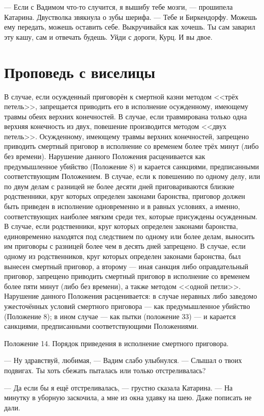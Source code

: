 --- Если с Вадимом что-то случится, я вышибу тебе мозги, --- прошипела Катарина.
Двустволка звякнула о зубы шерифа.
--- Тебе и Биркендорфу.
Можешь ему передать, можешь оставить себе.
Выкручивайся как хочешь.
Ты сам заварил эту кашу, сам и отвечать будешь.
Уйди с дороги, Курц.
И вы двое.

\section{Проповедь с виселицы}

\epigraph{
В случае, если осужденный приговорён к смертной казни методом <<трёх петель>>, запрещается приводить его в исполнение осужденному, имеющему травмы обеих верхних конечностей.
В случае, если травмирована только одна верхняя конечность из двух, повешение производится методом <<двух петель>>.
Осужденному, имеющему травмы верхних конечностей, запрещено приводить смертный приговор в исполнение со временем более трёх минут (либо без времени).
Нарушение данного Положения расценивается как предумышленное убийство (Положение 8) и карается санкциями, предписанными соответствующим Положением.
В случае, если к повешению по одному делу, или по двум делам с разницей не более десяти дней приговариваются близкие родственники, круг которых определен законами баронства, приговор должен быть приведен в исполнение одновременно и в равных условиях, а именно, соответствующих наиболее мягким среди тех, которые присуждены осужденным.
В случае, если родственники, круг которых определен законами баронства, единовременно находятся под следствием по одному или более делам, выносить им приговоры с разницей более чем в десять дней запрещено.
В случае, если одному из родственников, круг которых определен законами баронства, был вынесен смертный приговор, а второму --- иная санкция либо оправдательный приговор, запрещено приводить смертный приговор в исполнение со временем более пяти минут (либо без времени), а также методом <<одной петли>>.
Нарушение данного Положения расценивается: в случае неравных либо заведомо ужесточённых условий смертного приговора --- как предумышленное убийство (Положение 8); в ином случае --- как пытки (положение 33) --- и карается санкциями, предписанными соответствующими Положениями.
}{
Положение 14.
Порядок приведения в исполнение смертного приговора.
}

--- Ну здравствуй, любимая, --- Вадим слабо улыбнулся.
--- Слышал о твоих подвигах.
Ты хоть сбежать пыталась или только отстреливалась?

--- Да если бы я ещё отстреливалась, --- грустно сказала Катарина.
--- На минутку в уборную заскочила, а мне из окна удавку на шею.
Даже пописать не дали.

